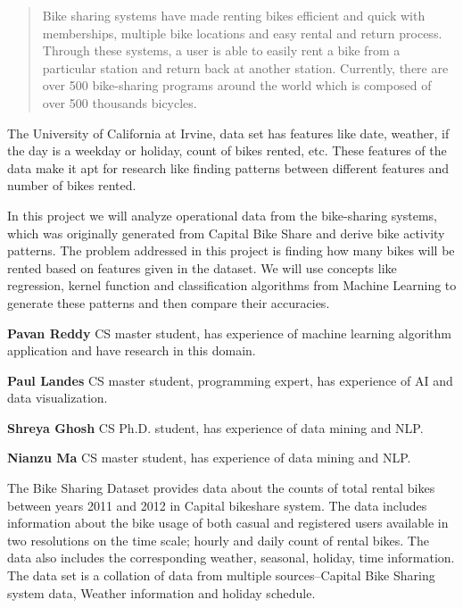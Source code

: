 \documentclass[12pt]{article}
\author{\theauthor}
\newcommand{\ci}[1]{\cite{#1}}
\begin{document}
\maketitle

\begin{abstract}
Bike sharing systems have made renting bikes efficient and quick with
memberships, multiple bike locations and easy rental and return
process. Through these systems, a user is able to easily rent a bike from a
particular station and return back at another station. Currently, there are
over 500 bike-sharing programs around the world which is composed of over 500
thousands bicycles\ci{ucibikeshare}.
\end{abstract}



The University of California at Irvine, data set has features like date,
weather, if the day is a weekday or holiday, count of bikes rented, etc. These
features of the data make it apt for research like finding patterns between
different features and number of bikes rented.

In this project we will analyze operational data from the bike-sharing systems,
which was originally generated from Capital Bike Share and derive bike activity
patterns. The problem addressed in this project is finding how many bikes will
be rented based on features given in the dataset. We will use concepts like
regression, kernel function and classification algorithms from Machine Learning
to generate these patterns and then compare their accuracies.

{\bf Pavan Reddy}
CS master student, has experience of machine learning algorithm application and
have research in this domain.

\noindent
{\bf Paul Landes} CS master student, programming expert, has experience of AI
and data visualization.

\noindent
{\bf Shreya Ghosh} CS Ph.D. student, has experience of data mining and NLP.

\noindent
{\bf Nianzu Ma} CS master student, has experience of data mining and NLP.



The Bike Sharing Dataset provides data about the counts of total rental bikes
between years 2011 and 2012 in Capital bikeshare system. The data includes
information about the bike usage of both casual and registered users available
in two resolutions on the time scale; hourly and daily count of rental
bikes. The data also includes the corresponding weather, seasonal, holiday,
time information. The data set is a collation of data from multiple
sources--Capital Bike Sharing system data\ci{capbikeshare}, Weather
information\ci{freemeteo} and holiday schedule\ci{holiday}.
\end{document}
